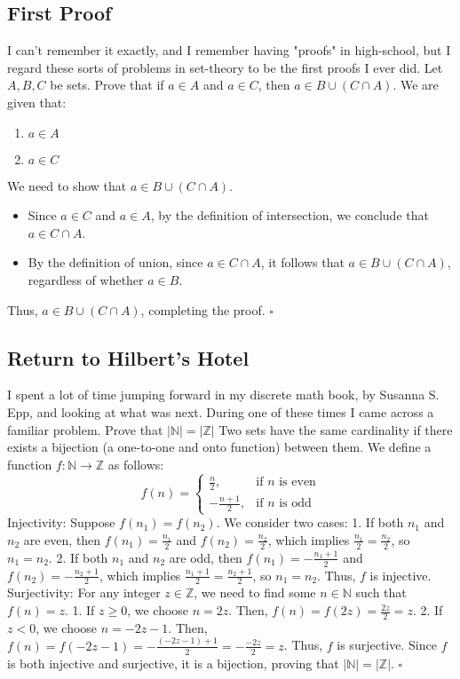 \documentclass{article}
\begin{document}
\subsection*{First Proof}
I can't remember it exactly, and I remember having "proofs" in high-school, but I regard these sorts of problems in set-theory to be the first proofs I ever did.
Let \( A, B, C \) be sets. Prove that if \( a \in A \) and \( a \in C \), then \( a \in B \cup (C \cap A) \).
We are given that:
\begin{enumerate}
    \item \( a \in A \)
    \item \( a \in C \)
\end{enumerate}
We need to show that \( a \in B \cup (C \cap A) \).
\begin{itemize}
    \item Since \( a \in C \) and \( a \in A \), by the definition of intersection, we conclude that \( a \in C \cap A \).
    \item By the definition of union, since \( a \in C \cap A \), it follows that \( a \in B \cup (C \cap A) \), regardless of whether \( a \in B \).
\end{itemize}
Thus, \( a \in B \cup (C \cap A) \), completing the proof. \(\square\)

\subsection*{Return to Hilbert's Hotel}
I spent a lot of time jumping forward in my discrete math book, by Susanna S. Epp, and looking at what was next.
During one of these times I came across a familiar problem.
Prove that \( |\mathbb{N}| = |\mathbb{Z}| \)
Two sets have the same cardinality if there exists a bijection (a one-to-one and onto function) between them. We define a function \( f: \mathbb{N} \to \mathbb{Z} \) as follows:
\[
f(n) =
\begin{cases} 
\frac{n}{2}, & \text{if } n \text{ is even} \\ 
-\frac{n+1}{2}, & \text{if } n \text{ is odd} 
\end{cases}
\]
Injectivity:
Suppose \( f(n_1) = f(n_2) \). We consider two cases:
1. If both \( n_1 \) and \( n_2 \) are even, then \( f(n_1) = \frac{n_1}{2} \) and \( f(n_2) = \frac{n_2}{2} \), which implies \( \frac{n_1}{2} = \frac{n_2}{2} \), so \( n_1 = n_2 \).
2. If both \( n_1 \) and \( n_2 \) are odd, then \( f(n_1) = -\frac{n_1+1}{2} \) and \( f(n_2) = -\frac{n_2+1}{2} \), which implies \( \frac{n_1+1}{2} = \frac{n_2+1}{2} \), so \( n_1 = n_2 \).
Thus, \( f \) is injective.
Surjectivity:
For any integer \( z \in \mathbb{Z} \), we need to find some \( n \in \mathbb{N} \) such that \( f(n) = z \).
1. If \( z \geq 0 \), we choose \( n = 2z \). Then, \( f(n) = f(2z) = \frac{2z}{2} = z \).
2. If \( z < 0 \), we choose \( n = -2z - 1 \). Then, \( f(n) = f(-2z - 1) = -\frac{(-2z - 1) + 1}{2} = -\frac{-2z}{2} = z \).
Thus, \( f \) is surjective.
Since \( f \) is both injective and surjective, it is a bijection, proving that \( |\mathbb{N}| = |\mathbb{Z}| \). \(\square\)
\end{document}
